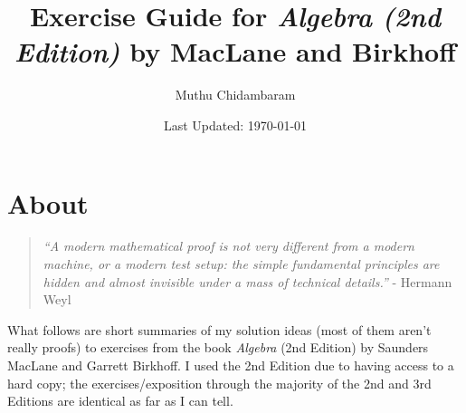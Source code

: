 \documentclass{article}
\begin{document}
\title{Exercise Guide for \textit{Algebra (2nd Edition)} by MacLane and Birkhoff}
\author{Muthu Chidambaram}
\date{Last Updated: \today}

\maketitle

\tableofcontents
\newpage 

\section*{About}

\begin{quote}
        \textit{``A modern mathematical proof is not very different from a modern machine,
or a modern test setup: the simple fundamental principles are hidden 
and almost invisible under a mass of technical details.''} - Hermann Weyl
\end{quote}

What follows are short summaries of my solution ideas (most of them aren't really proofs) to exercises
from the book \textit{Algebra} (2nd Edition) by Saunders MacLane and Garrett Birkhoff.
I used the 2nd Edition due to having access to a hard copy; the exercises/exposition through the majority
of the 2nd and 3rd Editions are identical as far as I can tell.



\end{document}
